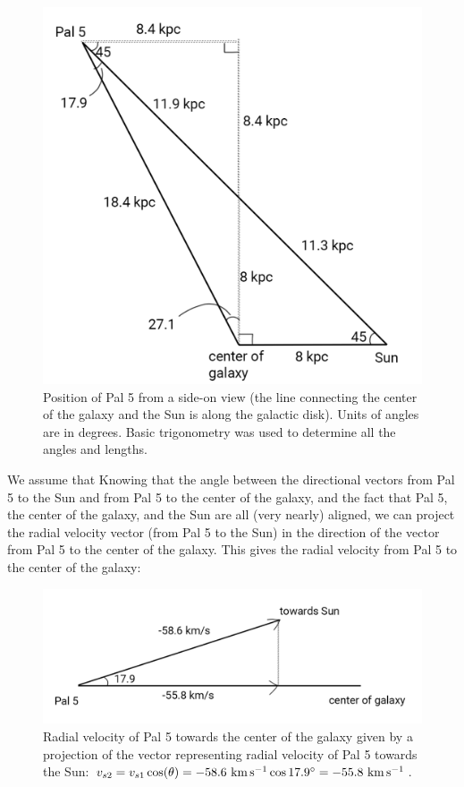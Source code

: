 \documentclass[11pt,letterpaper]{article}
\begin{document}
    \begin{figure}[!htb]
        \centering
        \includegraphics[width=0.4\linewidth]{trig.png}
        \caption{\label{fig:trig}Position of Pal 5 from a side-on view (the line connecting the center of the galaxy and the Sun is along the galactic disk). Units of angles are in degrees. Basic trigonometry was used to determine all the angles and lengths.}
    \end{figure}
    We assume that Knowing that the angle between the directional vectors from Pal 5 to the Sun and from Pal 5 to the center of the galaxy, and the fact that Pal 5, the center of the galaxy, and the Sun are all (very nearly) aligned, we can project the radial velocity vector (from Pal 5 to the Sun) in the direction of the vector from Pal 5 to the center of the galaxy. This gives the radial velocity from Pal 5 to the center of the galaxy:
        \begin{figure}[!htb]
            \centering
            \includegraphics[width=0.5\linewidth]{projection.png}
            \caption{\label{fig:proj}Radial velocity of Pal 5 towards the center of the galaxy given by a projection of the vector representing radial velocity of Pal 5 towards the Sun: $v_{s2} = v_{s1} \cos(\theta) = -58.6~{\rm km\,s^{-1}}\cos{17.9^\circ} = -55.8~{\rm km\,s^{-1}}$.}
        \end{figure}
    
\end{document}
